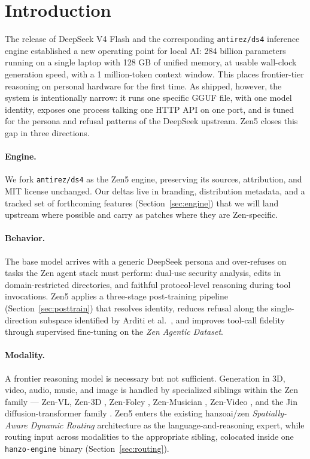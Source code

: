 \documentclass[11pt,a4paper]{article}
\begin{document}
\tableofcontents
\newpage

\section{Introduction}

The release of DeepSeek V4 Flash \cite{deepseekv4flash} and the corresponding \texttt{antirez/ds4}
inference engine \cite{antirez-ds4} established a new operating point for local AI: 284 billion
parameters running on a single laptop with 128 GB of unified memory, at usable wall-clock generation
speed, with a 1 million-token context window. This places frontier-tier reasoning on personal hardware
for the first time. As shipped, however, the system is intentionally narrow: it runs one specific GGUF
file, with one model identity, exposes one process talking one HTTP API on one port, and is tuned for
the persona and refusal patterns of the DeepSeek upstream. Zen5 closes this gap in three directions.

\paragraph{Engine.} We fork \texttt{antirez/ds4} as the Zen5 engine, preserving its sources, attribution,
and MIT license unchanged. Our deltas live in branding, distribution metadata, and a tracked set of
forthcoming features (Section~\ref{sec:engine}) that we will land upstream where possible and carry as
patches where they are Zen-specific.

\paragraph{Behavior.} The base model arrives with a generic DeepSeek persona and over-refuses on tasks
the Zen agent stack must perform: dual-use security analysis, edits in domain-restricted directories,
and faithful protocol-level reasoning during tool invocations. Zen5 applies a three-stage post-training
pipeline (Section~\ref{sec:posttrain}) that resolves identity, reduces refusal along the single-direction
subspace identified by Arditi et al.\ \cite{arditi2024refusal}, and improves tool-call fidelity through
supervised fine-tuning on the \emph{Zen Agentic Dataset}.

\paragraph{Modality.} A frontier reasoning model is necessary but not sufficient. Generation in 3D,
video, audio, music, and image is handled by specialized siblings within the Zen family --- Zen-VL,
Zen-3D \cite{zen3d}, Zen-Foley \cite{zenfoley}, Zen-Musician \cite{zenmusician}, Zen-Video
\cite{zenvideo}, and the Jin diffusion-transformer family \cite{jin}. Zen5 enters the existing
hanzoai/zen \emph{Spatially-Aware Dynamic Routing} architecture \cite{hanzoai-zen} as the
language-and-reasoning expert, while routing input across modalities to the appropriate sibling,
colocated inside one \texttt{hanzo-engine} binary (Section~\ref{sec:routing}).
\end{document}
